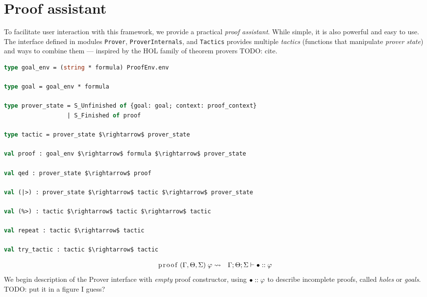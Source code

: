 \documentclass[english, mgr]{iithesis}
\renewcommand{\tt}[1]{\texttt{\small{#1}}}
\renewcommand{\it}[1]{\textit{#1}}
\begin{document}
\section{Proof assistant}
To facilitate user interaction with this framework, we provide a practical \it{proof assistant}.
While simple, it is also powerful and easy to use.
The interface defined in modules \tt{Prover}, \tt{ProverInternals}, and \tt{Tactics} provides multiple \it{tactics}
(functions that manipulate \it{prover state}) and ways to combine them
--- inspired by the HOL family of theorem provers TODO: cite.
\begin{lstlisting}[mathescape, language=OCaml]
type goal_env = (string * formula) ProofEnv.env

type goal = goal_env * formula

type prover_state = S_Unfinished of {goal: goal; context: proof_context}
                  | S_Finished of proof

type tactic = prover_state $\rightarrow$ prover_state

val proof : goal_env $\rightarrow$ formula $\rightarrow$ prover_state

val qed : prover_state $\rightarrow$ proof

val (|>) : prover_state $\rightarrow$ tactic $\rightarrow$ prover_state

val (%>) : tactic $\rightarrow$ tactic $\rightarrow$ tactic

val repeat : tactic $\rightarrow$ tactic

val try_tactic : tactic $\rightarrow$ tactic
\end{lstlisting}
\newcommand{\hole}{\ensuremath{\bullet}}
\begin{eqnarray*}
  \text{\lstinline[columns=fixed]{proof}}\;(\Gamma,\Theta,\Sigma)\;\formphi &  \leadsto & \jgmnt[\Gamma; \Theta; \Sigma]{\hole\ofkind\formphi}
  \end{eqnarray*}
We begin description of the Prover interface with \it{empty} proof constructor,
using $\hole\ofkind\formphi$ to describe incomplete proofs,
called \it{holes} or \it{goals}.
TODO: put it in a figure I guess?
\end{document}
